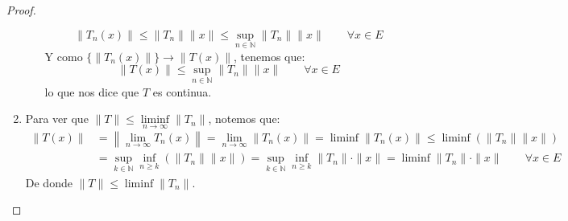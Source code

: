 \begin{coro}
\begin{proof}
\begin{enumerate}[label=(\alph*)]
\begin{itemize}
                        \begin{equation*}
                            \|T_n(x)\| \leq \|T_n\|\|x\| \leq \sup_{n\in \mathbb{N}}\|T_n\|\|x\| \qquad \forall x\in E
                        \end{equation*}
                        Y como $\{\|T_n(x)\|\}\to \|T(x)\|$, tenemos que:
                        \begin{equation*}
                            \|T(x)\| \leq \sup_{n\in \mathbb{N}}\|T_n\|\|x\| \qquad \forall x\in E
                        \end{equation*}
                        lo que nos dice que $T$ es continua.
                \end{itemize}
            \item Para ver que $\|T\| \leq \liminf\limits_{n\to \infty} \|T_n\|$, notemos que:
                \begin{align*}
                    \|T(x)\| &= \left\|\lim_{n\to\infty}T_n(x)\right\| = \lim_{n\to\infty}\left\|T_n(x)\right\| = \liminf \|T_n(x)\| \leq \liminf(\|T_n\|\|x\|) \\
                             &= \sup_{k\in \mathbb{N}}\inf_{n\geq k}(\|T_n\|\|x\|) = \sup_{k\in \mathbb{N}}\inf_{n\geq k}\|T_n\| \cdot \|x\| = \liminf \|T_n\| \cdot \|x\| \qquad \forall x\in E
                \end{align*}
                De donde $\|T\|\leq \liminf \|T_n\|$.
        \end{enumerate}
    \end{proof}
\end{coro}

